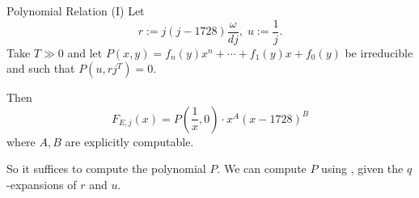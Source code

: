 \documentclass[handout]{beamer}
\begin{document}
\begin{frame}{Polynomial Relation (I)}
Let 
\[
r := j(j-1728)  \frac{\omega }{{d j}}, \;  u := \frac{1}{j}.
\]
Take $T \gg 0$ and let $P(x,y) = f_n(y)x^n + \cdots + f_1(y)x + f_0(y)$ be irreducible and such that $P(u, rj^T) = 0$. 


\begin{Prop}[C.]
Then
\[
		F_{E,j}(x) = P(\frac{1}{x}, 0) \cdot x^{A} (x - 1728)^B
\]	
where $A,B$ are explicitly computable. 
\end{Prop}

So it suffices to compute the polynomial $P$.  We can compute $P$ using , given the 
$q$-expansions of $r$ and $u$. 

\end{frame}











\end{document}
